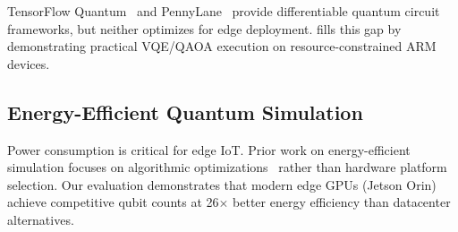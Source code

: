 TensorFlow Quantum~\cite{tfq} and PennyLane~\cite{pennylane} provide differentiable quantum circuit frameworks, but neither optimizes for edge deployment. \EdgeQuantum fills this gap by demonstrating practical VQE/QAOA execution on resource-constrained ARM devices.

\subsection{Energy-Efficient Quantum Simulation}

Power consumption is critical for edge IoT. Prior work on energy-efficient simulation focuses on algorithmic optimizations~\cite{jones2019quest} rather than hardware platform selection. Our evaluation demonstrates that modern edge GPUs (Jetson Orin) achieve competitive qubit counts at 26$\times$ better energy efficiency than datacenter alternatives.
